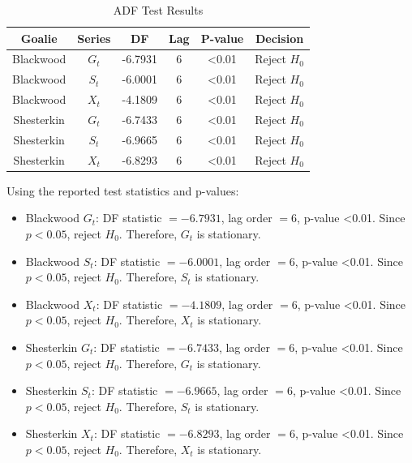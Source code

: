 \documentclass[
  10pt,
]{extarticle}
\providecommand{\tightlist}{%
  \setlength{\itemsep}{0pt}\setlength{\parskip}{0pt}}
\begin{document}
\begin{center}
\scriptsize
\begin{table}[H]

\caption{\label{tab:adf-results-table}ADF Test Results}
\centering
\begin{tabular}[t]{cccccc}
\toprule
Goalie & Series & DF & Lag & P-value & Decision\\
\midrule
Blackwood & $G_t$ & -6.7931 & 6 & <0.01 & Reject $H_0$\\
Blackwood & $S_t$ & -6.0001 & 6 & <0.01 & Reject $H_0$\\
Blackwood & $X_t$ & -4.1809 & 6 & <0.01 & Reject $H_0$\\
Shesterkin & $G_t$ & -6.7433 & 6 & <0.01 & Reject $H_0$\\
Shesterkin & $S_t$ & -6.9665 & 6 & <0.01 & Reject $H_0$\\
\addlinespace
Shesterkin & $X_t$ & -6.8293 & 6 & <0.01 & Reject $H_0$\\
\bottomrule
\end{tabular}
\end{table}
\normalsize
\end{center}

Using the reported test statistics and p-values:

\begin{itemize}
\tightlist
\item
  Blackwood \(G_t\): DF statistic \(=-6.7931\), lag order \(=6\), p-value \textless0.01. Since \(p < 0.05\), reject \(H_0\). Therefore, \(G_t\) is stationary.
\item
  Blackwood \(S_t\): DF statistic \(=-6.0001\), lag order \(=6\), p-value \textless0.01. Since \(p < 0.05\), reject \(H_0\). Therefore, \(S_t\) is stationary.
\item
  Blackwood \(X_t\): DF statistic \(=-4.1809\), lag order \(=6\), p-value \textless0.01. Since \(p < 0.05\), reject \(H_0\). Therefore, \(X_t\) is stationary.
\item
  Shesterkin \(G_t\): DF statistic \(=-6.7433\), lag order \(=6\), p-value \textless0.01. Since \(p < 0.05\), reject \(H_0\). Therefore, \(G_t\) is stationary.
\item
  Shesterkin \(S_t\): DF statistic \(=-6.9665\), lag order \(=6\), p-value \textless0.01. Since \(p < 0.05\), reject \(H_0\). Therefore, \(S_t\) is stationary.
\item
  Shesterkin \(X_t\): DF statistic \(=-6.8293\), lag order \(=6\), p-value \textless0.01. Since \(p < 0.05\), reject \(H_0\). Therefore, \(X_t\) is stationary.
\end{itemize}
\end{document}
